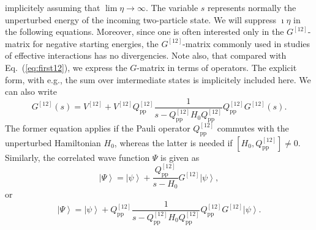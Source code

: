 \documentclass{article}
\newcommand{\ket}[1]{\left| #1 \right\rangle}
\begin{document}
implicitely assuming that $\lim \eta \rightarrow \infty$.
The variable $s$ represents normally the unperturbed
energy of the incoming two-particle state. We will suppress $\imath \eta$ in the
following equations. Moreover, since one is often interested only in the
$G^{[12]}$-matrix
for negative starting energies, the $G^{[12]}$-matrix commonly used in studies
of effective interactions has no divergencies. Note also, that compared with 
Eq.~(\ref{eq:first12}), we express the $G$-matrix in terms of operators. The explicit form,
with e.g., the sum over imtermediate states is implicitely included here.
We can also write
\begin{equation}
      G^{[12]}(s )=V^{[12]}+V^{[12]}Q^{[12]}_{\mathrm{pp}}
      \frac{1}{s -Q^{[12]}_{\mathrm{pp}}H_0Q^{[12]}_{\mathrm{pp}}}
      Q^{[12]}_{\mathrm{pp}}
      G^{[12]}(s ).
      \label{eq:g2}
\end{equation}
The former equation applies if the Pauli operator $Q^{[12]}_{\mathrm{pp}}$  commutes
with the unperturbed Hamiltonian $H_0$, whereas the latter is
needed if $[H_0,Q^{[12]}_{\mathrm{pp}}]\neq 0$.
Similarly, the correlated wave function $\Psi$
is given as
\begin{equation}
    \ket{\Psi}=\ket{\psi}+
    \frac{Q^{[12]}_{\mathrm{pp}}}{s - H_0}G^{[12]}\ket{\psi},
    \label{eq:wave}
\end{equation}
or
\begin{equation}
   \ket{\Psi}=\ket{\psi}+Q^{[12]}_{\mathrm{pp}}\frac{1}
    {s - Q^{[12]}_{\mathrm{pp}}H_0Q^{[12]}_{\mathrm{pp}}}
    Q^{[12]}_{\mathrm{pp}}G^{[12]}\ket{\psi}.
\end{equation}
\end{document}
